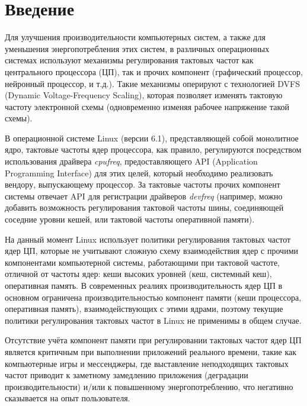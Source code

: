 \section{Введение}
\label{sec:Section0} 

    Для улучшения производительности компьютерных систем, а также для уменьшения энергопотребления
    этих систем, в различных операционных системах
    используют механизмы регулирования тактовых частот как центрального процессора (ЦП),
    так и прочих компонент (графический процессор, нейронный процессор, и т.д.). Такие механизмы
    оперируют с технологией DVFS (Dynamic Voltage-Frequency Scaling), которая позволяет изменять
    тактовую частоту электронной схемы (одновременно изменяя рабочее напряжение такой схемы).

    В операционной системе Linux (версии 6.1), представляющей собой монолитное ядро,
    тактовые частоты ядер процессора, как правило, регулируются посредством использования драйвера
    \textit{cpufreq}, предоставляющего API (Application Programming Interface) для этих целей, который
    необходимо реализовать вендору, выпускающему процессор. За тактовые частоты прочих компонент системы
    отвечает API для регистрации драйверов \textit{devfreq} (например, можно добавить возможность
    регулирования тактовой частоты шины,
    соединяющей соседние уровни кешей, или тактовой частоты оперативной памяти).

    На данный момент Linux использует политики регулирования тактовых частот ядер ЦП, которые
    не учитывают сложную схему взаимодействия ядер с прочими компонентами компьютерной системы,
    работающими при тактовой частоте, отличной от частоты ядер: кеши высоких уровней (кеш, системный кеш),
    оперативная память. В современных реалиях производительность ядер ЦП в основном ограничена
    производительностью компонент памяти (кеши процессора, оперативная память), взаимодействующих с этими
    ядрами, поэтому текущие политики регулирования тактовых частот в Linux не применимы в общем случае.

    Отсутствие учёта компонент памяти при регулировании тактовых частот ядер ЦП является
    критичным при выполнении приложений реального времени, такие как компьютерные игры и мессенджеры, где
    выставление неподходящих тактовых частот приводит к заметному замедлению приложения (деградации
    производительности) и/или к повышенному энергопотреблению, что негативно сказывается на
    опыт пользователя.

